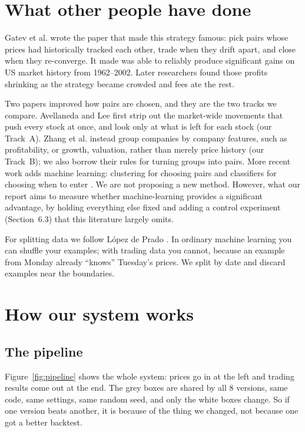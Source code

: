 \documentclass[10pt]{article}
\begin{document}
\section{What other people have done}

Gatev et al. \cite{gatev2006} wrote the paper that made this strategy
famous: pick pairs whose prices had historically tracked each other, trade when
they drift apart, and close when they re-converge. It made was able to reliably produce significant gains on
US market history from 1962--2002. Later researchers found those profits shrinking as the
strategy became crowded and fees ate the rest.

Two papers improved how pairs are chosen, and they are the two tracks we compare.
Avellaneda and Lee \cite{avellaneda2010} first strip out the market-wide
movements that push every stock at once, and look only at what is left for each
stock (our Track~A). Zhang et al. \cite{zhang2014} instead group
companies by company features, such as profitability, or growth,
valuation, rather than merely price history (our Track~B); we also borrow their
rules for turning groups into pairs. More recent work adds machine learning:
clustering for choosing pairs \cite{sarmento2020, rotondi2024} and classifiers
for choosing when to enter \cite{ekinci2025}. We are not proposing a new method.
However, what our report aims to measure whether machine-learning provides a significant advantage, by
holding everything else fixed and adding a control experiment (Section~6.3) that
this literature largely omits.

For splitting data we follow López de Prado \cite{lopezdeprado2018}. In ordinary
machine learning you can shuffle your examples; with trading data you cannot,
because an example from Monday already ``knows'' Tuesday's prices. We split by
date and discard examples near the boundaries.

\section{How our system works}

\subsection{The pipeline}

Figure~\ref{fig:pipeline} shows the whole system: prices go in at the left and
trading results come out at the end. The grey boxes are shared by all 8 versions, same code, same settings, same random seed, and only the white boxes change. So if one version beats another, it is because of the thing we changed,
not because one got a better backtest.
\end{document}
